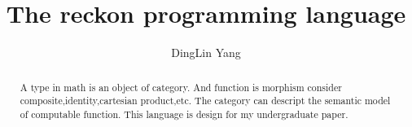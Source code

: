 \documentclass[a4paper,14pt]{article}
\title{The reckon programming language}
\author{DingLin Yang}
\begin{document}
\maketitle
\begin{abstract}
 A type in math is an object of category.
 And function is morphism consider composite,identity,cartesian product,etc.
 The category can descript the semantic model of computable function.
  This language is design for my undergraduate paper.
\end{abstract}
\chapter{
}
\end{document}

